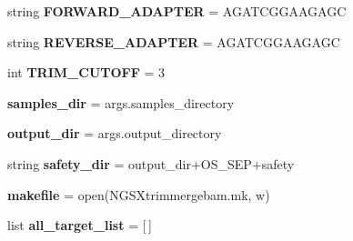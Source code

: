 \begin{DoxyCompactItemize}
\item 
string {\bfseries F\+O\+R\+W\+A\+R\+D\+\_\+\+A\+D\+A\+P\+T\+ER} = \textquotesingle{}A\+G\+A\+T\+C\+G\+G\+A\+A\+G\+A\+GC\textquotesingle{}\hypertarget{namespaceNGSXtrimmergebam_af393ef53250397f1c53474560cdaa998}{}\label{namespaceNGSXtrimmergebam_af393ef53250397f1c53474560cdaa998}

\item 
string {\bfseries R\+E\+V\+E\+R\+S\+E\+\_\+\+A\+D\+A\+P\+T\+ER} = \textquotesingle{}A\+G\+A\+T\+C\+G\+G\+A\+A\+G\+A\+GC\textquotesingle{}\hypertarget{namespaceNGSXtrimmergebam_aba48ebc4e836da2ebf1c06caeb8628ce}{}\label{namespaceNGSXtrimmergebam_aba48ebc4e836da2ebf1c06caeb8628ce}

\item 
int {\bfseries T\+R\+I\+M\+\_\+\+C\+U\+T\+O\+FF} = 3\hypertarget{namespaceNGSXtrimmergebam_acddbb9c2799dd440f90cdda6d2261614}{}\label{namespaceNGSXtrimmergebam_acddbb9c2799dd440f90cdda6d2261614}

\item 
{\bfseries samples\+\_\+dir} = args.\+samples\+\_\+directory\hypertarget{namespaceNGSXtrimmergebam_a5bcccff4baf05d71adc8a2be553302d3}{}\label{namespaceNGSXtrimmergebam_a5bcccff4baf05d71adc8a2be553302d3}

\item 
{\bfseries output\+\_\+dir} = args.\+output\+\_\+directory\hypertarget{namespaceNGSXtrimmergebam_aa4f79c055dd22a7e4575459c9dfddf24}{}\label{namespaceNGSXtrimmergebam_aa4f79c055dd22a7e4575459c9dfddf24}

\item 
string {\bfseries safety\+\_\+dir} = output\+\_\+dir+O\+S\+\_\+\+S\+EP+\textquotesingle{}safety\textquotesingle{}\hypertarget{namespaceNGSXtrimmergebam_a20feed31b0588330769f8fd34471fb39}{}\label{namespaceNGSXtrimmergebam_a20feed31b0588330769f8fd34471fb39}

\item 
{\bfseries makefile} = open(\textquotesingle{}N\+G\+S\+Xtrimmergebam.\+mk\textquotesingle{}, \textquotesingle{}w\textquotesingle{})\hypertarget{namespaceNGSXtrimmergebam_a1ca1cc48785cf7118354da7b1342c053}{}\label{namespaceNGSXtrimmergebam_a1ca1cc48785cf7118354da7b1342c053}

\item 
list {\bfseries all\+\_\+target\+\_\+list} = \mbox{[}$\,$\mbox{]}\hypertarget{namespaceNGSXtrimmergebam_aee41c480255967a43d8170adbf546f0c}{}\label{namespaceNGSXtrimmergebam_aee41c480255967a43d8170adbf546f0c}


\end{DoxyCompactItemize}
